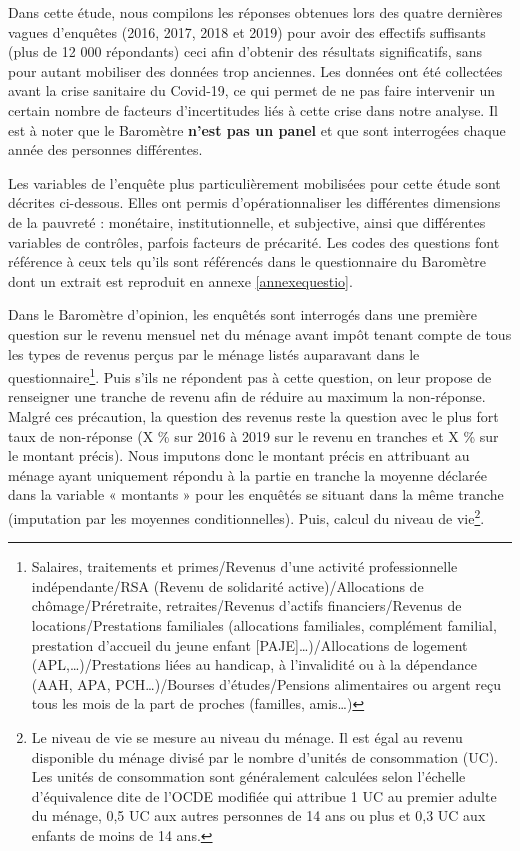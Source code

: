 \documentclass[12pt,a4paper]{reedthesis}
\begin{document}
Dans cette étude, nous compilons les réponses obtenues lors des quatre dernières vagues d'enquêtes (2016, 2017, 2018 et 2019) pour avoir des effectifs suffisants (plus de 12 000 répondants) ceci afin d'obtenir des résultats significatifs, sans pour autant mobiliser des données trop anciennes. Les données ont été collectées avant la crise sanitaire du Covid-19, ce qui permet de ne pas faire intervenir un certain nombre de facteurs d'incertitudes liés à cette crise dans notre analyse. Il est à noter que le Baromètre \textbf{n'est pas un panel} et que sont interrogées chaque année des personnes différentes.

Les variables de l'enquête plus particulièrement mobilisées pour cette étude sont décrites ci-dessous. Elles ont permis d'opérationnaliser les différentes dimensions de la pauvreté : monétaire, institutionnelle, et subjective, ainsi que différentes variables de contrôles, parfois facteurs de précarité. Les codes des questions font référence à ceux tels qu'ils sont référencés dans le questionnaire du Baromètre dont un extrait est reproduit en annexe \ref{annexequestio}.

Dans le Baromètre d'opinion, les enquêtés sont interrogés dans une première question sur le revenu mensuel net du ménage avant impôt tenant compte de tous les types de revenus perçus par le ménage listés auparavant dans le questionnaire\footnote{ Salaires, traitements et primes/Revenus d'une activité professionnelle indépendante/RSA (Revenu de solidarité active)/Allocations de chômage/Préretraite,
  retraites/Revenus d'actifs financiers/Revenus de locations/Prestations familiales (allocations familiales, complément familial, prestation d'accueil du jeune enfant {[}PAJE{]}\ldots)/Allocations de logement (APL,\ldots)/Prestations liées au handicap, à l'invalidité ou à la dépendance (AAH, APA, PCH\ldots)/Bourses d'études/Pensions alimentaires ou argent reçu tous les mois de la part de proches (familles, amis\ldots)}. Puis s'ils ne répondent pas à cette question, on leur propose de renseigner une tranche de revenu afin de réduire au maximum la non-réponse. Malgré ces précaution, la question des revenus reste la question avec le plus fort taux de non-réponse (X \% sur 2016 à 2019 sur le revenu en tranches et X \% sur le montant précis). Nous imputons donc le montant précis en attribuant au ménage ayant uniquement répondu à la partie en tranche la moyenne déclarée dans la variable « montants » pour les enquêtés se situant dans la même tranche (imputation par les moyennes conditionnelles). Puis, calcul du niveau de vie\footnote{ Le niveau de vie se mesure au niveau du ménage. Il est égal au revenu disponible du ménage divisé par le nombre d'unités de consommation (UC). Les unités de consommation sont généralement calculées selon l'échelle d'équivalence dite de l'OCDE modifiée qui attribue 1 UC au premier adulte du ménage, 0,5 UC aux autres personnes de 14 ans ou plus et 0,3 UC aux enfants de moins de 14 ans.}.
\end{document}
